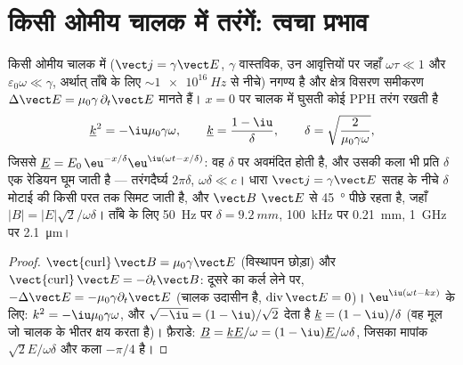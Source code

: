 \section{किसी ओमीय चालक में तरंगें: त्वचा प्रभाव}

\begin{theorem}[त्वचा प्रभाव]\label{thm:b2:waves-in-media:skin}
किसी ओमीय चालक में ($\vect j = \gamma\vect E$, $\gamma$ वास्तविक, उन आवृत्तियों पर
जहाँ $\omega\tau \ll 1$ और $\varepsilon_0\omega \ll \gamma$, अर्थात् ताँबे के लिए $\sim\qty{1e16}{Hz}$ से
नीचे)  नगण्य है और क्षेत्र
विसरण समीकरण $\Delta\vect E = \mu_0\gamma\,\partial_t\vect E$ मानते हैं। $x = 0$ पर चालक में
घुसती कोई PPH तरंग रखती है
\[
\underline k^2 = -\iu\mu_0\gamma\omega , \qquad \underline k = \frac{1 - \iu}\delta , \qquad
\delta = \sqrt{\frac2{\mu_0\gamma\omega}} ,
\]
जिससे $\underline E = E_0\,\eu^{-x/\delta}\eu^{\iu(\omega t - x/\delta)}$: वह
\emph{} $\delta$ पर अवमंदित होती है, और उसकी कला भी प्रति
$\delta$ एक रेडियन घूम जाती है --- तरंगदैर्घ्य $2\pi\delta$,  $\omega\delta \ll
c$। धारा $\vect j = \gamma\vect E$ सतह के नीचे
$\delta$ मोटाई की किसी परत तक सिमट जाती है, और $\vect B$ $\vect E$ से \qty{45}{\degree} पीछे रहता है, जहाँ
$|B| = |E|\sqrt2/\omega\delta$। ताँबे के लिए \qty{50}{Hz} पर $\delta = \qty{9.2}{mm}$,
\qty{100}{kHz} पर \qty{0.21}{mm}, \qty{1}{GHz} पर \qty{2.1}{\micro m}।
\end{theorem}

\begin{proof}
$\operatorname{\vect{curl}}\vect B = \mu_0\gamma\vect E$ (विस्थापन छोड़ा) और
$\operatorname{\vect{curl}}\vect E = -\partial_t\vect B$: दूसरे का कर्ल लेने पर,
$-\Delta\vect E = -\mu_0\gamma\partial_t\vect E$ (चालक उदासीन है, $\operatorname{div}
\vect E = 0$)। $\eu^{\iu(\omega t - kx)}$ के लिए: $k^2 = -\iu\mu_0\gamma\omega$, और
$\sqrt{-\iu} = (1 - \iu)/\sqrt2$ देता है $\underline k = (1 - \iu)/\delta$ (वह मूल जो
चालक के भीतर क्षय करता है)। फ़ैराडे: $\underline B = \underline k\underline E/\omega = (1 - \iu)
\underline E/\omega\delta$, जिसका मापांक $\sqrt2E/\omega\delta$ और कला $-\pi/4$ है।
\end{proof}

